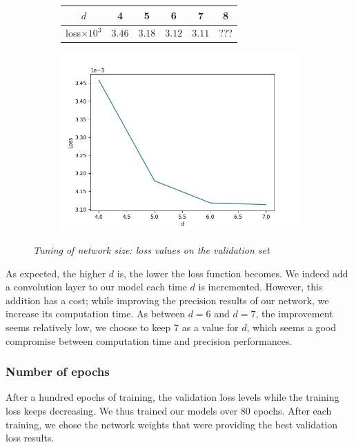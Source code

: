 \documentclass{article}
\begin{document}
            \begin{figure}[!ht]
                \begin{subfigure}{.49\linewidth}
                    \centering
                    \begin{tabular}{|c|c|c|c|c|c|}
                        \hline
                        $d$ & 4 & 5 & 6 & 7 & 8 \\
                        \hline \hline
                        loss$\times 10^3$ & $3.46$ & $3.18$ & $3.12$ & $3.11$ & ??? \\
                        \hline
                    \end{tabular}
                \end{subfigure}
                \begin{subfigure}{.49\linewidth}
                    \centering
                    \includegraphics[width=.8\linewidth]{pics/hpp-d.png}
                \end{subfigure}
                \caption{\textit{Tuning of network size: loss values on the validation set}}
            \end{figure}
            \par
            As expected, the higher $d$ is, the lower the loss function becomes. We indeed add a convolution layer to our model each time $d$ is incremented. However, this addition has a cost; while improving the precision results of our network, we increase its computation time. As between $d=6$ and $d=7$, the improvement seems relatively low, we choose to keep 7 as a value for $d$, which seems a good compromise between computation time and precision performances.

        \subsubsection{Number of epochs}
            After a hundred epochs of training, the validation loss levels while the training loss keeps decreasing. We thus trained our models over 80 epochs. After each training, we chose the network weights that were providing the best validation loss results.
\end{document}

